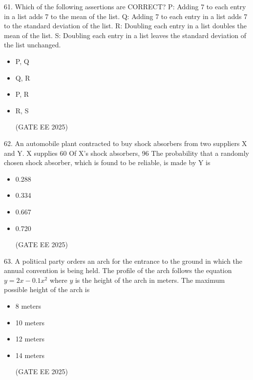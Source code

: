\documentclass[twocolumn]{article}
\begin{document}

61. Which of the following assertions are CORRECT?  
P: Adding 7 to each entry in a list adds 7 to the mean of the list.  
Q: Adding 7 to each entry in a list adds 7 to the standard deviation of the list.  
R: Doubling each entry in a list doubles the mean of the list.  
S: Doubling each entry in a list leaves the standard deviation of the list unchanged.

\begin{itemize}
\item[(A)] P, Q

\item[(B)] Q, R

\item[(C)] P, R

\item[(D)] R, S

(GATE EE 2025)
  \end{itemize}




62. An automobile plant contracted to buy shock absorbers from two suppliers X and Y.  
X supplies 60%
Of X’s shock absorbers, 96%
The probability that a randomly chosen shock absorber, which is found to be reliable, is made by Y is

\begin{itemize}
\item[(A)] 0.288

\item[(B)] 0.334

\item[(C)] 0.667

\item[(D)] 0.720

(GATE EE 2025)
  \end{itemize}




63. A political party orders an arch for the entrance to the ground in which the annual convention is being held.  
The profile of the arch follows the equation $y = 2x - 0.1x^2$ where $y$ is the height of the arch in meters.  
The maximum possible height of the arch is

\begin{itemize}
\item[(A)] 8 meters

\item[(B)] 10 meters

\item[(C)] 12 meters

\item[(D)] 14 meters

(GATE EE 2025)
  \end{itemize}
\end{document}
